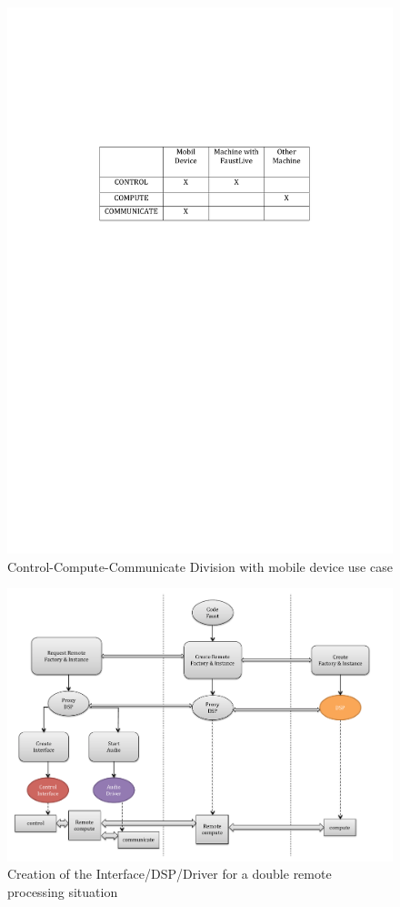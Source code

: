 \documentclass[a4paper]{article}
\begin{document}
\begin{figure}[!h]
\begin{center}
\includegraphics[width=0.7\columnwidth]{images/9CCC}
\caption{Control-Compute-Communicate Division with mobile device use case}
\label{fig:62CCC}
\end{center}
\end{figure}

\begin{figure}[!h]
\begin{center}
\begin{minipage}[c]{\linewidth}
\includegraphics[width=0.9\columnwidth]{images/CCC9}
\end{minipage}
\caption{Creation of the Interface/DSP/Driver for a double remote processing situation}
\label{fig:CCC4}
\end{center}
\end{figure}
\end{document}
